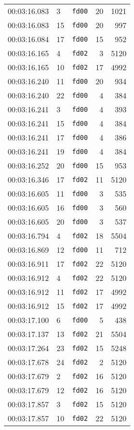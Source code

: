 \documentclass{article}
\begin{document}
\begin{longtable}{lllrr}
00:03:16.083 & 3 & \texttt{fd00} & 20 & 1021 \\
00:03:16.083 & 15 & \texttt{fd00} & 20 & 997 \\
00:03:16.084 & 17 & \texttt{fd00} & 15 & 952 \\
00:03:16.165 & 4 & \texttt{fd02} & 3 & 5120 \\
00:03:16.165 & 10 & \texttt{fd02} & 17 & 4992 \\
00:03:16.240 & 11 & \texttt{fd00} & 20 & 934 \\
00:03:16.240 & 22 & \texttt{fd00} & 4 & 384 \\
00:03:16.241 & 3 & \texttt{fd00} & 4 & 393 \\
00:03:16.241 & 15 & \texttt{fd00} & 4 & 384 \\
00:03:16.241 & 17 & \texttt{fd00} & 4 & 386 \\
00:03:16.241 & 19 & \texttt{fd00} & 4 & 384 \\
00:03:16.252 & 20 & \texttt{fd00} & 15 & 953 \\
00:03:16.346 & 17 & \texttt{fd02} & 11 & 5120 \\
00:03:16.605 & 11 & \texttt{fd00} & 3 & 535 \\
00:03:16.605 & 16 & \texttt{fd00} & 3 & 560 \\
00:03:16.605 & 20 & \texttt{fd00} & 3 & 537 \\
00:03:16.794 & 4 & \texttt{fd02} & 18 & 5504 \\
00:03:16.869 & 12 & \texttt{fd00} & 11 & 712 \\
00:03:16.911 & 17 & \texttt{fd02} & 22 & 5120 \\
00:03:16.912 & 4 & \texttt{fd02} & 22 & 5120 \\
00:03:16.912 & 11 & \texttt{fd02} & 17 & 4992 \\
00:03:16.912 & 15 & \texttt{fd02} & 17 & 4992 \\
00:03:17.100 & 6 & \texttt{fd00} & 5 & 438 \\
00:03:17.137 & 13 & \texttt{fd02} & 21 & 5504 \\
00:03:17.264 & 23 & \texttt{fd02} & 15 & 5248 \\
00:03:17.678 & 24 & \texttt{fd02} & 2 & 5120 \\
00:03:17.679 & 2 & \texttt{fd02} & 16 & 5120 \\
00:03:17.679 & 12 & \texttt{fd02} & 16 & 5120 \\
00:03:17.857 & 3 & \texttt{fd02} & 15 & 5120 \\
00:03:17.857 & 10 & \texttt{fd02} & 22 & 5120 \\

\end{longtable}
\end{document}
